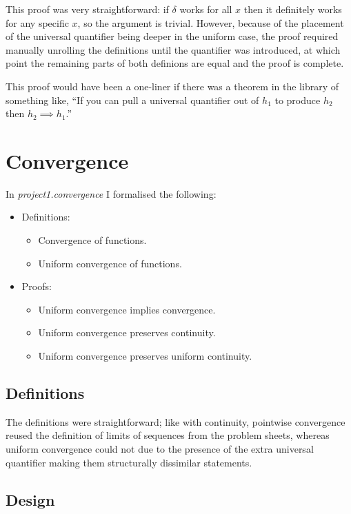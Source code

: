 \documentclass[a4paper, twoside, 11pt]{article}
\theoremstyle{definition}
\theoremstyle{plain}
\theoremstyle{remark}
\begin{document}
This proof was very straightforward: if $\delta$ works for all $x$ then it definitely works for any specific $x$, so the argument is trivial. However, because of the placement of the universal quantifier being deeper in the uniform case, the proof required manually unrolling the definitions until the quantifier was introduced, at which point the remaining parts of both definions are equal and the proof is complete.

This proof would have been a one-liner if there was a theorem in the library of something like, ``If you can pull a universal quantifier out of $h_{1}$ to produce $h_{2}$ then $h_{2} \implies h_{1}$.''


\section{Convergence}

In \emph{project1.convergence} I formalised the following:
\begin{itemize}
    \item Definitions:
    \begin{itemize}
        \item Convergence of functions.
        \item Uniform convergence of functions.
    \end{itemize}
    \item Proofs:
    \begin{itemize}
        \item Uniform convergence implies convergence.
        \item Uniform convergence preserves continuity.
        \item Uniform convergence preserves uniform continuity.
    \end{itemize}
\end{itemize}


\subsection{Definitions}

The definitions were straightforward; like with continuity, pointwise convergence reused the definition of limits of sequences from the problem sheets, whereas uniform convergence could not due to the presence of the extra universal quantifier making them structurally dissimilar statements.

\subsection*{Design}
\end{document}

